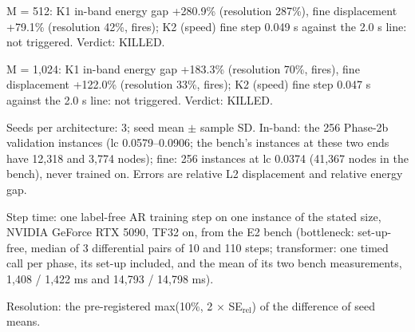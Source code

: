 \begin{table}[t]
\centering
\small
\caption{E2 (3D): token bottleneck against the point-token transformer under the same label-free AR objective, corpus, split, seeds and schedule.}
\label{tab:e2}

\smallskip
\begin{minipage}{\linewidth}\footnotesize\raggedright
M = 512: K1 in-band energy gap +280.9\% (resolution 287\%), fine displacement +79.1\% (resolution 42\%, fires); K2 (speed) fine step 0.049 s against the 2.0 s line: not triggered. Verdict: KILLED.\par
M = 1,024: K1 in-band energy gap +183.3\% (resolution 70\%, fires), fine displacement +122.0\% (resolution 33\%, fires); K2 (speed) fine step 0.047 s against the 2.0 s line: not triggered. Verdict: KILLED.\par
Seeds per architecture: 3; seed mean $\pm$ sample SD. In-band: the 256 Phase-2b validation instances (lc 0.0579--0.0906; the bench's instances at these two ends have 12,318 and 3,774 nodes); fine: 256 instances at lc 0.0374 (41,367 nodes in the bench), never trained on. Errors are relative L2 displacement and relative energy gap.\par
Step time: one label-free AR training step on one instance of the stated size, NVIDIA GeForce RTX 5090, TF32 on, from the E2 bench (bottleneck: set-up-free, median of 3 differential pairs of 10 and 110 steps; transformer: one timed call per phase, its set-up included, and the mean of its two bench measurements, 1,408 / 1,422 ms and 14,793 / 14,798 ms).\par
Resolution: the pre-registered max(10\%, 2 $\times$ SE$_\mathrm{rel}$) of the difference of seed means.
\end{minipage}
\end{table}
